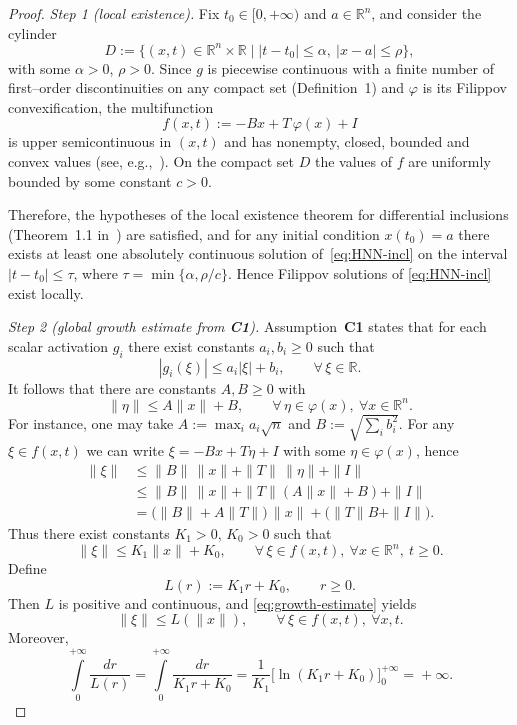 \documentclass[journal]{IEEEtran}
\newtheorem{proof}{Proof}
\begin{document}
\begin{proof}
\emph{Step 1 (local existence).}
Fix $t_0\in[0,+\infty)$ and $a\in\mathbb{R}^n$, and consider the
cylinder
\[
    D := \{(x,t)\in\mathbb{R}^n\times\mathbb{R} \mid
           |t-t_0|\le\alpha,\ |x-a|\le\rho\},
\]
with some $\alpha>0$, $\rho>0$.
Since $g$ is piecewise continuous with a finite number of first–order
discontinuities on any compact set (Definition~1) and $\varphi$ is its
Filippov convexification, the multifunction
\[
   f(x,t) := -B x + T\,\varphi(x) + I
\]
is upper semicontinuous in $(x,t)$ and has nonempty, closed, bounded
and convex values (see, e.g.,~\cite[Ch.~1]{YLG}).
On the compact set $D$ the values of $f$ are uniformly bounded by some
constant $c>0$.

Therefore, the hypotheses of the local existence theorem for
differential inclusions (Theorem~1.1 in~\cite[Ch.~1]{YLG}) are
satisfied, and for any initial condition $x(t_0)=a$ there exists at
least one absolutely continuous solution of~\eqref{eq:HNN-incl} on
the interval $|t-t_0|\le\tau$, where
$\tau = \min\{\alpha,\rho/c\}$. Hence Filippov solutions of
\eqref{eq:HNN-incl} exist locally.

\emph{Step 2 (global growth estimate from \textbf{C1}).}
Assumption~\textbf{C1} states that for each scalar activation $g_i$ there exist
constants $a_i,b_i\ge0$ such that
\[
   |g_i(\xi)| \le a_i|\xi| + b_i, \qquad \forall\,\xi\in\mathbb{R}.
\]
It follows that there are constants $A,B\ge0$ with
\[
   \|\eta\| \le A\|x\| + B,
   \qquad \forall\,\eta\in\varphi(x),\ \forall x\in\mathbb{R}^n.
\]
For instance, one may take
$A \!\!:=\!\! \max_i a_i \sqrt{n}$ and
$B \!\!:=\!\! \sqrt{\sum_i b_i^2}$.
For any $\xi\in f(x,t)$ we can write
$\xi = -B x + T\eta + I$ with some $\eta\in\varphi(x)$, hence
\[
\begin{aligned}
   \|\xi\|
   &\le \|B\|\,\|x\| + \|T\|\,\|\eta\| + \|I\| \\
   &\le \|B\|\,\|x\| + \|T\|(A\|x\|+B) + \|I\| \\
   &= \bigl(\|B\| + A\|T\|\bigr)\,\|x\|
      + \bigl(\|T\|B + \|I\|\bigr).
\end{aligned}
\]
Thus there exist constants $K_1>0$, $K_0>0$ such that
\begin{equation}
   \|\xi\| \le K_1 \|x\| + K_0,
   \qquad \forall\,\xi\in f(x,t),\ \forall x\in\mathbb{R}^n,\ t\ge0.
   \label{eq:growth-estimate}
\end{equation}
Define
\[
   L(r) := K_1 r + K_0, \qquad r\ge0.
\]
Then $L$ is positive and continuous, and
\eqref{eq:growth-estimate} yields
\[
   \|\xi\| \le L(\|x\|),
   \qquad \forall\,\xi\in f(x,t),\ \forall x,t.
\]
Moreover,
\[
   \int\limits_0^{+\infty} \!\!\!\! \frac{dr}{L(r)}
   = \int\limits_0^{+\infty}\!\!\!\!\!\! \frac{dr}{K_1 r + K_0}
   = \frac{1}{K_1} \bigl[\ln(K_1 r + K_0)\bigr]_{0}^{+\infty}
   \! = \! +\infty.
\]


\end{proof}
\end{document}
